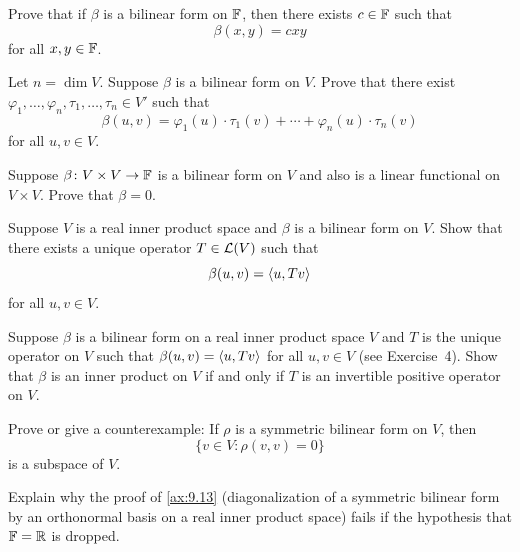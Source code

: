 \begin{exc}

\begin{exercise}
Prove that if $\beta$ is a bilinear form on $\mathbb{F}$, then there exists $c\in\mathbb{F}$
such that
\[ \beta(x,y) = cxy \]
for all $x,y\in\mathbb{F}$.
\end{exercise}

\begin{exercise}
Let $n=\dim V$. Suppose $\beta$ is a bilinear form on $V$. Prove that there
exist $\varphi_1,\dots,\varphi_n,\tau_1,\dots,\tau_n\in V'$ such that
\[ \beta(u,v) = \varphi_1(u)\cdot\tau_1(v)+\cdots+\varphi_n(u)\cdot\tau_n(v) \]
for all $u,v\in V$.
\end{exercise}

\begin{exercise}
Suppose $\beta\colon V\times V\to\mathbb{F}$ is a bilinear form on $V$ and also is a
linear functional on $V\times V$. Prove that $\beta=0$.
\end{exercise}

\begin{exercise}
Suppose $V$ is a real inner product space and $\beta$ is a bilinear form on
$V$. Show that there exists a unique operator $T\in\mathcal{L}(V)$ such that
\[ \beta(u,v) = \langle u, Tv \rangle \]
for all $u,v\in V$.
\end{exercise}

\begin{exercise}
Suppose $\beta$ is a bilinear form on a real inner product space $V$ and $T$ is
the unique operator on $V$ such that $\beta(u,v)=\langle u, Tv \rangle$ for all
$u,v\in V$ (see Exercise~4). Show that $\beta$ is an inner product on $V$ if
and only if $T$ is an invertible positive operator on $V$.
\end{exercise}

\begin{exercise}
Prove or give a counterexample: If $\rho$ is a symmetric bilinear form on $V$,
then
\[ \{v\in V : \rho(v,v)=0\} \]
is a subspace of $V$.
\end{exercise}

\begin{exercise}
Explain why the proof of \ref{ax:9.13} (diagonalization of a symmetric bilinear
form by an orthonormal basis on a real inner product space) fails if the
hypothesis that $\mathbb{F}=\mathbb{R}$ is dropped.
\end{exercise}


\end{exc}

